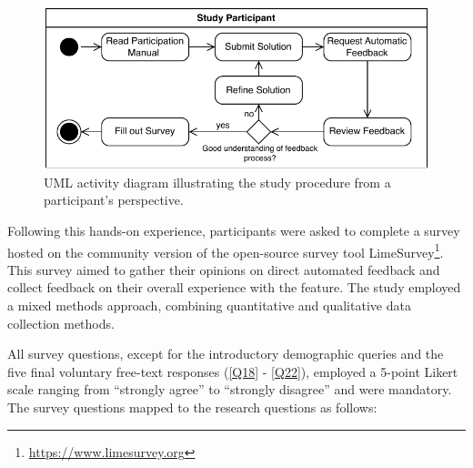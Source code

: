 \documentclass[manuscript,screen,review, anonymous]{acmart}
\begin{document}
\begin{figure}[htbp]
  \centering
  \includegraphics[width=0.6\linewidth]{figures/Study-Design.pdf}
  \caption{UML activity diagram illustrating the study procedure from a participant's perspective.}
  \label{fig:Study-Design}
\end{figure}

Following this hands-on experience, participants were asked to complete a survey hosted on the community version of the open-source survey tool LimeSurvey\footnote{\url{https://www.limesurvey.org}}.
This survey aimed to gather their opinions on direct automated feedback and collect feedback on their overall experience with the feature.
The study employed a mixed methods approach, combining quantitative and qualitative data collection methods.

All survey questions, except for the introductory demographic queries and the five final voluntary free-text responses (\ref{Q18} - \ref{Q22}), employed a 5-point Likert scale \cite{allen:2007:LikertScalesData} ranging from ``strongly agree'' to ``strongly disagree'' and were mandatory. 
The survey questions mapped to the research questions as follows:
\end{document}
